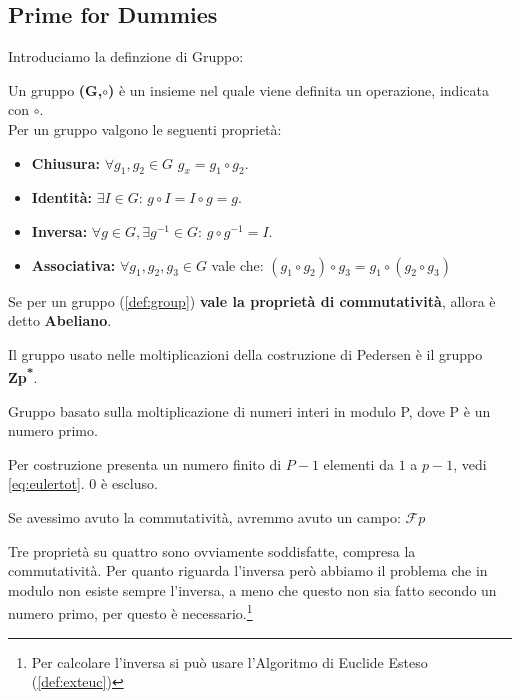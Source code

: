 \subsection{Prime for Dummies}
Introduciamo la definzione di Gruppo:
\begin{definition}[Group]\label{def:group}
Un gruppo \textbf{(G,$\circ$)} è un insieme  nel quale viene definita un operazione, indicata con $\circ$.\\
Per un gruppo valgono le seguenti proprietà:
\begin{itemize}
    \item \textbf{Chiusura:} $\forall g_1,g_2\in{G}$ $g_x=g_1\circ g_2$.
    \item \textbf{Identità:} $\exists I\in{G}:\,g\circ I=I\circ g=g$.
    \item \textbf{Inversa:} $\forall g\in G, \exists g^{-1}\in G:\,g\circ g^{-1}=I$.
    \item \textbf{Associativa:} $\forall g_1,g_2,g_3 \in G$ vale che: $(g_1\circ g_2)\circ g_3=g_1\circ (g_2\circ g_3)$
\end{itemize}
\end{definition}
\begin{corollary}\label{cor:abelian}
Se per un gruppo (\cref{def:group}) \textbf{vale la proprietà di commutatività}, allora è detto \textbf{Abeliano}.
\end{corollary}
Il gruppo usato nelle moltiplicazioni della costruzione di Pedersen è il gruppo \textbf{Zp\textsuperscript{*}}.
\begin{definition}[Zp\textsuperscript{*}]
Gruppo basato sulla moltiplicazione di numeri interi in modulo P, dove P è un numero primo.
\begin{remark}
Per costruzione presenta un numero finito di $P-1$ elementi da $1$ a $p-1$, vedi \cref{eq:eulertot}. 0 è escluso.
\end{remark}
\end{definition}
\begin{note}
Se avessimo avuto la commutatività, avremmo avuto un campo: $\mathcal{F}p$
\end{note}\pagebreak
\begin{remark}
Tre proprietà su quattro sono ovviamente soddisfatte, compresa la commutatività. Per quanto riguarda l'inversa però abbiamo il problema che in modulo non esiste sempre l'inversa, a meno che questo non sia fatto secondo un numero primo, per questo è necessario.\footnote{Per calcolare l'inversa si può usare l'Algoritmo di Euclide Esteso (\cref{def:exteuc})}
\end{remark}
